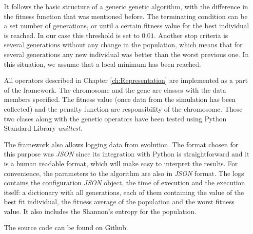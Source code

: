 It follows the basic structure of a generic genetic algorithm, with the difference in the fitness function that was mentioned before. The terminating condition can be a set number of generations, or until a certain fitness value for the best individual is reached. In our case this threshold is set to $0.01$. Another stop criteria is several generations without any change in the population, which means that for several generations any new individual was better than the worst previous one. In this situation, we assume that a local minimum has been reached. 

All operators described in Chapter \ref{ch:Representation} are implemented as a part of the framework. The chromosome and the gene are classes with the data members specified. The fitness value (once data from the simulation has been collected) and the penalty function are responsibility of the chromosome. Those two clases along with the genetic operators have been tested using Python Standard Library \textit{unittest}.

The framework also allows logging data from evolution. The format chosen for this purpose was \textit{JSON} since its integration with Python is straightforward and it is a human readable format, which will make easy to interpret the results. For convenience, the parameters to the algorithm are also in \textit{JSON} format. The logs contains the configuration \textit{JSON} object, the time of execution and the execution itself: a dictionary with all generations, each of them containing the value of the best fit individual, the fitness average of the population and the worst fitness value. It also includes the Shannon's entropy for the population.

The source code can be found on Github\cite{ab-level}.

